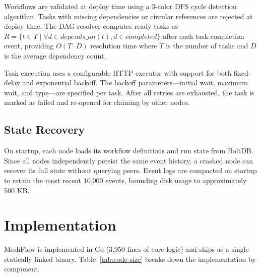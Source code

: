 \documentclass[sigconf]{acmart}
\begin{document}
Workflows are validated at deploy time using a 3-color DFS cycle detection algorithm. Tasks with missing dependencies or circular references are rejected at deploy time. The DAG resolver computes ready tasks as $R = \{t \in T \mid \forall d \in depends\_on(t), d \in completed\}$ after each task completion event, providing $O(T \cdot D)$ resolution time where $T$ is the number of tasks and $D$ is the average dependency count.

Task execution uses a configurable HTTP executor with support for both fixed-delay and exponential backoff. The backoff parameters---initial wait, maximum wait, and type---are specified per task. After all retries are exhausted, the task is marked as failed and re-opened for claiming by other nodes.

\subsection{State Recovery}

On startup, each node loads its workflow definitions and run state from BoltDB. Since all nodes independently persist the same event history, a crashed node can recover its full state without querying peers. Event logs are compacted on startup to retain the most recent 10,000 events, bounding disk usage to approximately 500 KB.

\section{Implementation}

MeshFlow is implemented in Go (3,950 lines of core logic) and ships as a single statically linked binary. Table~\ref{tab:code-size} breaks down the implementation by component.
\end{document}
